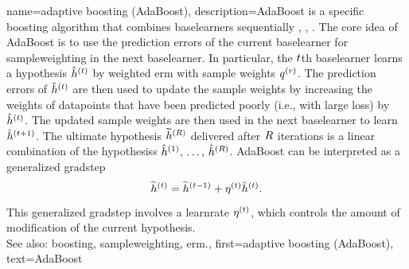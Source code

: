 {name={adaptive boosting (AdaBoost)},
	description={AdaBoost is a specific 
		\gls{boosting} \gls{algorithm} that combines \glspl{baselearner} sequentially 
		\cite{pmlr-vR2-ridgeway99a}, \cite{Schapire1999}, \cite{Drucker1997}. 
	    	The core idea of AdaBoost is to use the \gls{prediction} errors of the current  
		\gls{baselearner} for \gls{sampleweighting} in the next \gls{baselearner}. 
		In particular, the $t$th \gls{baselearner} learns a \gls{hypothesis} 
		$\hat{h}^{(t)}$ by weighted \gls{erm} with  
		\gls{sample} \glspl{weight} $q^{(r)}$. The \gls{prediction} errors of 
		$\hat{h}^{(t)}$ are then used to update the 
		\gls{sample} \glspl{weight} by increasing the \glspl{weight} of \glspl{datapoint} 
		that have been predicted poorly (i.e., with large \gls{loss}) 
		by $\hat{h}^{(t)}$. The updated \gls{sample} \glspl{weight} are 
		then used in the next \gls{baselearner} to learn $\hat{h}^{(t+1)}$. 
		The ultimate \gls{hypothesis} $\widetilde{h}^{(R)}$ delivered after 
		$R$ \glspl{iteration} is a linear combination of the \glspl{hypothesis} 
		$\hat{h}^{(1)},\,\ldots,\,\hat{h}^{(R)}$. 
		AdaBoost can be interpreted as a generalized \gls{gradstep} \cite[Ch. 10.4]{hastie01statisticallearning}
		$$\widetilde{h}^{(t)}=\widetilde{h}^{(t-1)}+\eta^{(t)} \hat{h}^{(t)}.$$   
		This generalized \gls{gradstep} involves a \gls{learnrate} $\eta^{(t)}$, which 
		controls the amount of modification of the current \gls{hypothesis}. 
		\\
		See also: \gls{boosting}, \gls{sampleweighting}, \gls{erm}.}, 
	first={adaptive boosting (AdaBoost)}, 
	text={AdaBoost}
}

